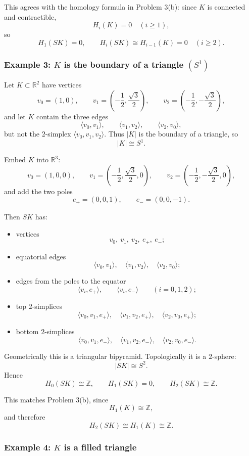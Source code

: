 \documentclass[12pt,a4paper]{article}
\theoremstyle{notespace}
\begin{document}
This agrees with the homology formula in Problem \(3\)(b): since \(K\) is connected and contractible,
\[
H_i(K)=0\quad (i\ge 1),
\]
so
\[
H_1(SK)=0,
\qquad
H_i(SK)\cong H_{i-1}(K)=0\quad (i\ge 2).
\]

\subsubsection*{Example 3: \(K\) is the boundary of a triangle \((S^1)\)}

Let \(K\subset \mathbb R^2\) have vertices
\[
v_0=(1,0),
\qquad
v_1=\left(-\frac12,\frac{\sqrt3}{2}\right),
\qquad
v_2=\left(-\frac12,-\frac{\sqrt3}{2}\right),
\]
and let \(K\) contain the three edges
\[
\langle v_0,v_1\rangle,
\qquad
\langle v_1,v_2\rangle,
\qquad
\langle v_2,v_0\rangle,
\]
but not the \(2\)-simplex \(\langle v_0,v_1,v_2\rangle\). Thus \(|K|\) is the boundary of a triangle, so
\[
|K|\cong S^1.
\]

Embed \(K\) into \(\mathbb R^3\):
\[
v_0=(1,0,0),\qquad
v_1=\left(-\frac12,\frac{\sqrt3}{2},0\right),\qquad
v_2=\left(-\frac12,-\frac{\sqrt3}{2},0\right),
\]
and add the two poles
\[
e_+=(0,0,1),
\qquad
e_-=(0,0,-1).
\]

Then \(SK\) has:
\begin{itemize}
	\item vertices
	\[
	v_0,\ v_1,\ v_2,\ e_+,\ e_-;
	\]
	\item equatorial edges
	\[
	\langle v_0,v_1\rangle,\quad
	\langle v_1,v_2\rangle,\quad
	\langle v_2,v_0\rangle;
	\]
	\item edges from the poles to the equator
	\[
	\langle v_i,e_+\rangle,\qquad \langle v_i,e_-\rangle \qquad (i=0,1,2);
	\]
	\item top \(2\)-simplices
	\[
	\langle v_0,v_1,e_+\rangle,\quad
	\langle v_1,v_2,e_+\rangle,\quad
	\langle v_2,v_0,e_+\rangle;
	\]
	\item bottom \(2\)-simplices
	\[
	\langle v_0,v_1,e_-\rangle,\quad
	\langle v_1,v_2,e_-\rangle,\quad
	\langle v_2,v_0,e_-\rangle.
	\]
\end{itemize}

Geometrically this is a triangular bipyramid. Topologically it is a \(2\)-sphere:
\[
|SK|\cong S^2.
\]
Hence
\[
H_0(SK)\cong \mathbb Z,
\qquad
H_1(SK)=0,
\qquad
H_2(SK)\cong \mathbb Z.
\]

This matches Problem \(3\)(b), since
\[
H_1(K)\cong \mathbb Z,
\]
and therefore
\[
H_2(SK)\cong H_1(K)\cong \mathbb Z.
\]

\subsubsection*{Example 4: \(K\) is a filled triangle}
\end{document}
